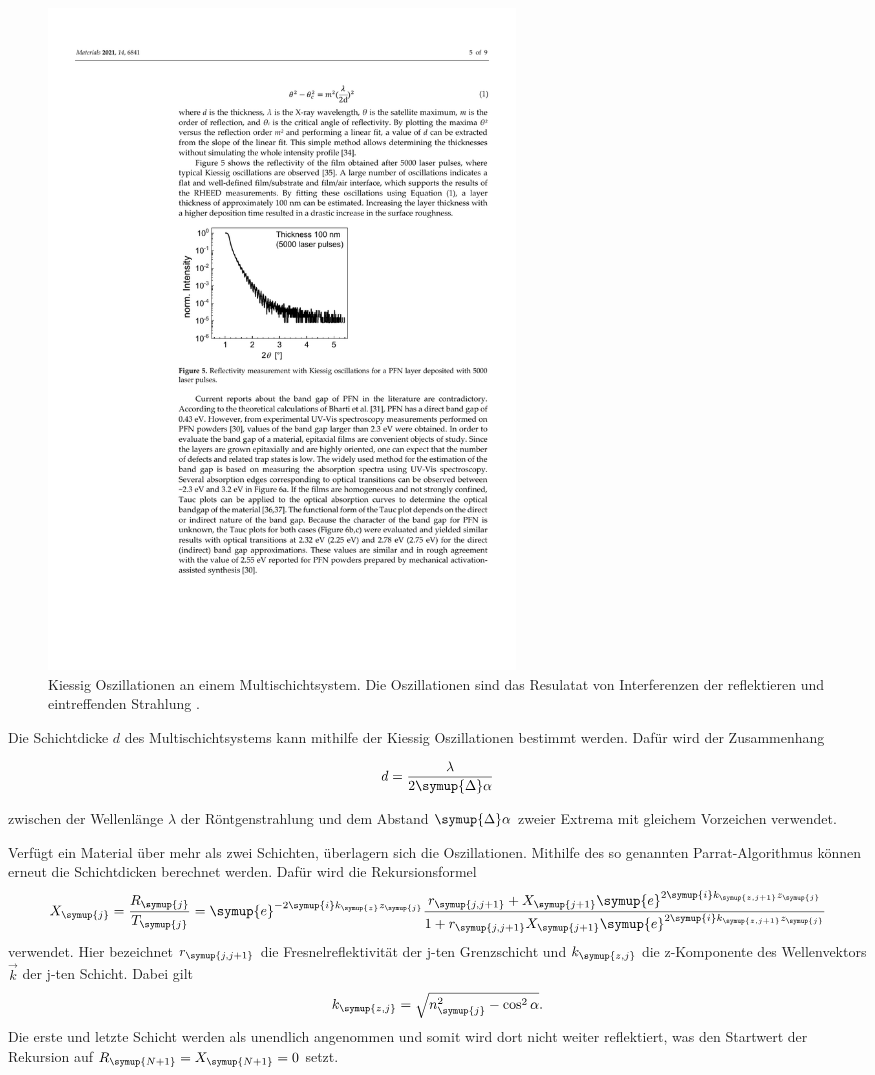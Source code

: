 \begin{figure}
    \centering
    \includegraphics[width=0.6\textwidth]{content/pics/kiessig_oscillation.pdf}
    \caption{Kiessig Oszillationen an einem Multischichtsystem. Die Oszillationen sind das Resulatat von Interferenzen der reflektieren und eintreffenden %
    Strahlung \cite{kiessig_oscillation}.}
    \label{fig:kiessig_oscillation}
\end{figure}

Die Schichtdicke $d$ des Multischichtsystems kann mithilfe der Kiessig Oszillationen bestimmt werden. Dafür wird der Zusammenhang

\begin{equation}
    d = \frac{\lambda}{2\symup{\Delta}\alpha}
    \label{eq:Schichtdicke}
\end{equation}

zwischen der Wellenlänge $\lambda$ der Röntgenstrahlung und dem Abstand $\symup{\Delta}\alpha$ zweier Extrema mit gleichem Vorzeichen verwendet.

Verfügt ein Material über mehr als zwei Schichten, überlagern sich die Oszillationen. Mithilfe des so genannten Parrat-Algorithmus können erneut die Schichtdicken berechnet werden.
Dafür wird die Rekursionsformel
\begin{equation}
    X_{\symup{j}} = \frac{R_{\symup{j}}}{T_{\symup{j}}} = \symup{e}^{-2\symup{i}k_{\symup{z}}z_{\symup{j}}}\frac{r_{\symup{j,j+1}}+X_{\symup{j+1}}\symup{e}^{2\symup{i}k_{\symup{z,j+1}}z_{\symup{j}}}}%
    {1+r_{\symup{j,j+1}}X_{\symup{j+1}}\symup{e}^{2\symup{i}k_{\symup{z,j+1}}z_{\symup{j}}}} %
    \label{eq:Parrat}
\end{equation}
verwendet. Hier bezeichnet $r_{\symup{j,j+1}}$ die Fresnelreflektivität der j-ten Grenzschicht und $k_{\symup{z,j}}$ die z-Komponente des Wellenvektors $\vec{k}$ der j-ten Schicht.
Dabei gilt
\begin{equation*}
    k_{\symup{z,j}} = \sqrt{n_{\symup{j}}^2 -\cos^2 \alpha}.
\end{equation*}
Die erste und letzte Schicht werden als unendlich angenommen und somit wird dort nicht weiter reflektiert, was den Startwert der Rekursion auf $R_{\symup{N+1}} = X_{\symup{N+1}} = 0$ setzt.

